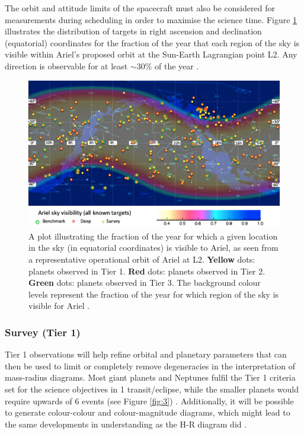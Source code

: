 \documentclass[12pt]{article}
\begin{document}
The orbit and attitude limits of the spacecraft must also be considered for measurements during scheduling in order to maximise the science time. Figure \ref{fig:1} illustrates the distribution of targets in right ascension and declination (equatorial) coordinates for the fraction of the year
that each region of the sky is visible within Ariel's proposed orbit at the Sun-Earth Lagrangian point L2. Any direction is observable for at least $\sim$30\% of the year \cite{zingales2018ariel,morales2022ariel}.

\begin{figure}[H]
    \centering
    \includegraphics[width=.9\textwidth]{ariel target map.png}
    \caption{A plot illustrating the fraction of the year for which a given location in the sky (in equatorial coordinates) is visible to Ariel, as seen from a representative operational
    orbit of Ariel at L2. \textbf{Yellow} dots: planets observed in Tier 1. \textbf{Red} dots: planets observed in Tier 2. \textbf{Green} dots: planets observed in Tier 3. \protect\cite{zingales2018ariel} The background colour levels represent the fraction of the year for which
    region of the sky is visible for Ariel \cite{morales2022ariel}.}
    \label{fig:1}
\end{figure}

\subsubsection{Survey (Tier 1)} \label{sec:3.3.1}

Tier 1 observations will help refine orbital and planetary parameters that can then be used to limit or completely remove degeneracies in the interpretation of mass-radius diagrams.
Most giant planets and Neptunes fulfil the Tier 1 criteria set for the science objectives in 1 transit/eclipse, while the smaller planets would require upwards of 6 events (see Figure \ref{fig:3}) \cite{zingales2018ariel}.
Additionally, it will be possible to generate colour-colour and colour-magnitude diagrams, which might lead to the same developments in understanding as the H-R diagram did \cite{edwards2019updated,salvignol2024ariel}.
\end{document}
